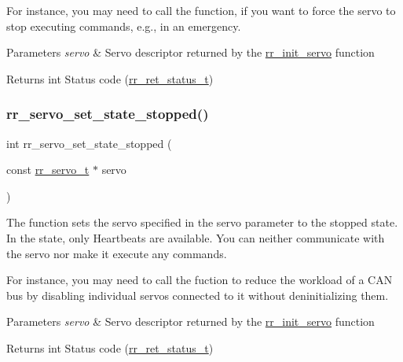 For instance, you may need to call the function, if you want to force the servo to stop executing commands, e.\+g., in an emergency.


\begin{DoxyParams}{Parameters}
{\em servo} & Servo descriptor returned by the \hyperlink{group___init_ga0adb313a3eeb8a4399431e940a1f3e9e}{rr\+\_\+init\+\_\+servo} function \\
\hline
\end{DoxyParams}
\begin{DoxyReturn}{Returns}
int Status code (\hyperlink{api_8h_a92d5be5038abcf89837faf85a08debdc}{rr\+\_\+ret\+\_\+status\+\_\+t}) 
\end{DoxyReturn}
\mbox{\label{group___state_ga02ca530236f87db0fcac9e136eafda4d}} 
\subsubsection{\texorpdfstring{rr\+\_\+servo\+\_\+set\+\_\+state\+\_\+stopped()}{rr\_servo\_set\_state\_stopped()}}
{\footnotesize\ttfamily int rr\+\_\+servo\+\_\+set\+\_\+state\+\_\+stopped (\begin{DoxyParamCaption}\item[{const \hyperlink{structrr__servo__t}{rr\+\_\+servo\+\_\+t} $\ast$}]{servo }\end{DoxyParamCaption})}



The function sets the servo specified in the \textquotesingle{}servo\textquotesingle{} parameter to the stopped state. In the state, only Heartbeats are available. You can neither communicate with the servo nor make it execute any commands. 

For instance, you may need to call the fuction to reduce the workload of a C\+AN bus by disabling individual servos connected to it without deninitializing them.


\begin{DoxyParams}{Parameters}
{\em servo} & Servo descriptor returned by the \hyperlink{group___init_ga0adb313a3eeb8a4399431e940a1f3e9e}{rr\+\_\+init\+\_\+servo} function \\
\hline
\end{DoxyParams}
\begin{DoxyReturn}{Returns}
int Status code (\hyperlink{api_8h_a92d5be5038abcf89837faf85a08debdc}{rr\+\_\+ret\+\_\+status\+\_\+t}) 
\end{DoxyReturn}
\mbox{\label{group___state_ga2433f49950ad40f06537287b52852c13}} 
